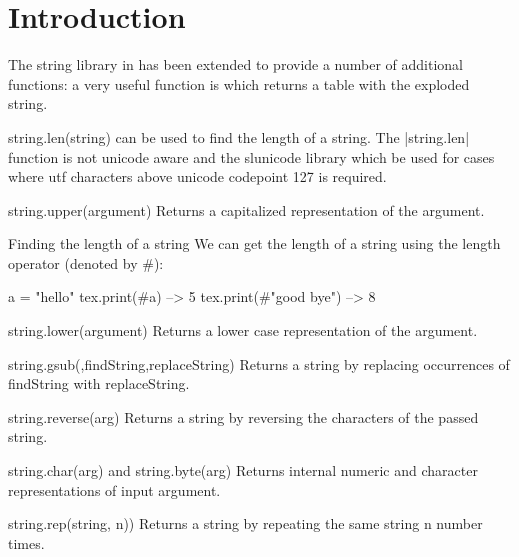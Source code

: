 \section{Introduction}


The \LUA string library in \LUA\tex has been extended to provide a number of additional functions: a very useful function is  which returns a table with the exploded string. 


\begin{docLua}{string.len(string)} 
can be used to find the length of a string.
The |string.len| function is not unicode aware and the slunicode library which be used for cases where utf characters above unicode codepoint 127 is required.
\end{docLua}


\begin{docLua}{string.upper(argument)}
Returns a capitalized representation of the argument.
\end{docLua}
\begin{texexample}{Finding the length of a string}{}
We can get the length of a string using the length operator (denoted by \#):
\begin{luacode}
a = "hello"
tex.print(#a) --> 5
tex.print(#"good bye") --> 8
\end{luacode}
\end{texexample}



\begin{docLua}{string.lower(argument)}
Returns a lower case representation of the argument.
\end{docLua}

\begin{docLua}{string.gsub(,findString,replaceString)}
Returns a string by replacing occurrences of findString with replaceString.
\end{docLua}

\begin{docLua}{string.reverse(arg)}
Returns a string by reversing the characters of the passed string.
\end{docLua}

\begin{docLua}{string.char(arg)} 
and string.byte(arg)
Returns internal numeric and character representations of input argument.
\end{docLua}

\begin{docLua}{string.rep(string, n))}
Returns a string by repeating the same string n number times.
\end{docLua}




